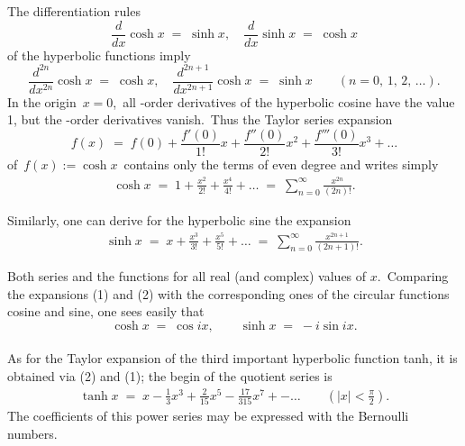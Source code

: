 \documentclass[12pt]{article}
\theoremstyle{definition}
\begin{document}
The differentiation rules
$$\frac{d}{dx}\cosh{x} \;=\; \sinh{x}, \quad \frac{d}{dx}\sinh{x} \;=\; \cosh{x}$$
 of the hyperbolic functions imply
$$\frac{d^{2n}}{dx^{2n}}\cosh{x} \;=\; \cosh{x}, \quad \frac{d^{2n+1}}{dx^{2n+1}}\cosh{x} \;=\; \sinh{x} 
\qquad (n = 0,\,1,\,2,\,\ldots).$$
In the origin \,$x = 0$,\, all -order derivatives of the hyperbolic cosine have the value 1, but the -order derivatives vanish.\, Thus the Taylor series expansion
$$f(x) \;=\; f(0)+\frac{f'(0)}{1!}x+\frac{f''(0)}{2!}x^2+\frac{f'''(0)}{3!}x^3+\ldots$$
of\, $f(x) := \cosh{x}$\, contains only the terms of even degree and writes simply
\begin{align}
\cosh{x} \;=\; 1+\frac{x^2}{2!}+\frac{x^4}{4!}+\ldots \;=\; \sum_{n=0}^\infty\frac{x^{2n}}{(2n)!}.
\end{align}


Similarly, one can derive for the hyperbolic sine the expansion
\begin{align}
\sinh{x} \;=\; x+\frac{x^3}{3!}+\frac{x^5}{5!}+\ldots \;=\; \sum_{n=0}^\infty\frac{x^{2n+1}}{(2n\!+\!1)!}.
\end{align}


Both series   and  the functions for all real (and complex) values of $x$.\, Comparing the expansions (1) and (2) with the corresponding ones of the circular functions cosine and sine, one sees easily that
$$\cosh{x} \;=\; \cos{ix}, \qquad \sinh{x} \;=\; -i\sin{ix}.$$\\

As for the Taylor expansion of the third important hyperbolic function  tanh, it is obtained via  (2) and (1); the begin of the quotient series is
\begin{align}
\tanh{x} \;=\; x-\frac{1}{3}x^3+\frac{2}{15}x^5-\frac{17}{315}x^7+-\ldots \qquad (|x| < \frac{\pi}{2}).
\end{align}
The coefficients of this power series may be expressed with the Bernoulli numbers.




\end{document}
